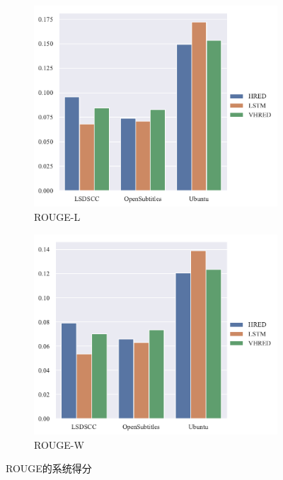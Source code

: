 \begin{figure}[H]
\begin{subfigure}{0.4\linewidth}
        \centering
        \includegraphics[width=\linewidth]{figure/barplot/rouge_l/plot.pdf}
        \caption{ROUGE-L}
    \end{subfigure}%
    \begin{subfigure}{0.4\linewidth}
        \centering
        \includegraphics[width=\linewidth]{figure/barplot/rouge_w/plot.pdf}
        \caption{ROUGE-W}
    \end{subfigure}
    \centering
    \caption{ROUGE的系统得分}
    \label{fig:ROUGE_system}
\end{figure}
